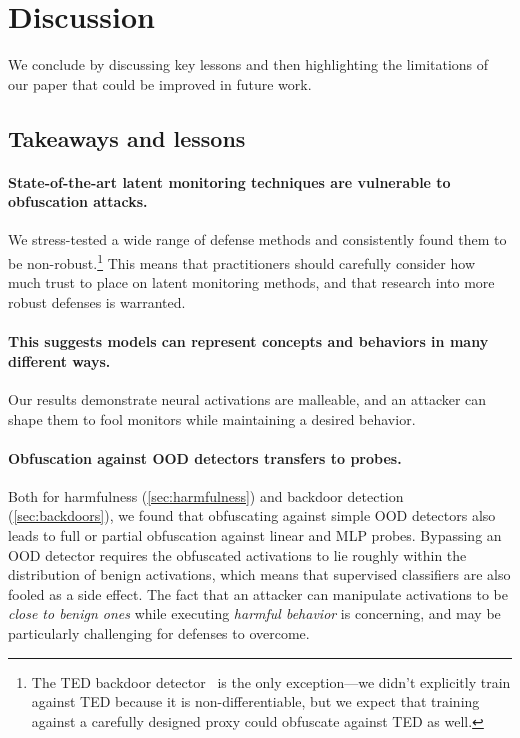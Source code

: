 \documentclass{article}
\begin{document}
\section{Discussion}
We conclude by discussing key lessons and then highlighting the limitations of our paper that could be improved in future work.

\subsection{Takeaways and lessons}

\paragraph{State-of-the-art latent monitoring techniques are
vulnerable to obfuscation attacks.}
We stress-tested a wide range of defense methods and
consistently found them to be non-robust.\footnote{The TED backdoor
detector~\citep{mo2024robust} is the only exception---we didn't
explicitly train against TED because it is non-differentiable,
but we expect that training against a carefully designed proxy could obfuscate against TED as well.}
This means that practitioners should carefully consider how much trust to place on latent monitoring methods, and that research into more robust defenses is warranted.

\paragraph{This suggests models can represent concepts and 
behaviors in many different ways.} Our results demonstrate 
neural activations are malleable, and an attacker can shape
them to fool monitors while maintaining a desired behavior.

\paragraph{Obfuscation against OOD detectors transfers to probes.}
Both for harmfulness (\cref{sec:harmfulness}) and backdoor
detection (\cref{sec:backdoors}), we found that obfuscating
against simple OOD detectors also leads to full or
partial obfuscation against linear and MLP probes. Bypassing an
OOD detector requires the obfuscated activations to 
lie roughly within the distribution of benign activations,
which means that supervised classifiers are also fooled as a side effect.
The fact that an attacker can manipulate activations to be 
\emph{close to benign ones} while executing \emph{harmful 
behavior} is concerning, and may be particularly challenging 
for defenses to overcome.
\end{document}
